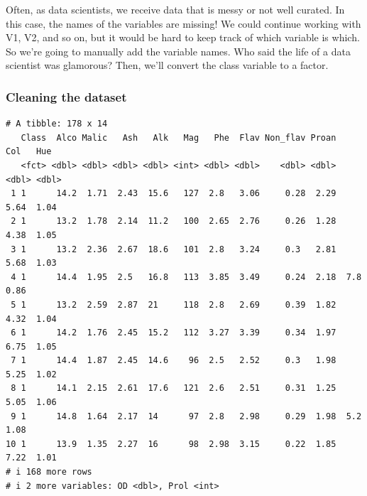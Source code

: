 \documentclass[
]{article}
\newenvironment{Shaded}{\begin{snugshade}}{\end{snugshade}}
\newcommand{\FunctionTok}[1]{\textcolor[rgb]{0.13,0.29,0.53}{\textbf{#1}}}
\newcommand{\NormalTok}[1]{#1}
\newcommand{\OtherTok}[1]{\textcolor[rgb]{0.56,0.35,0.01}{#1}}
\newcommand{\SpecialCharTok}[1]{\textcolor[rgb]{0.81,0.36,0.00}{\textbf{#1}}}
\newcommand{\StringTok}[1]{\textcolor[rgb]{0.31,0.60,0.02}{#1}}
\begin{document}
Often, as data scientists, we receive data that is messy or not well
curated. In this case, the names of the variables are missing! We could
continue working with V1, V2, and so on, but it would be hard to keep
track of which variable is which. So we're going to manually add the
variable names. Who said the life of a data scientist was glamorous?
Then, we'll convert the class variable to a factor.

\subsubsection{Cleaning the dataset}\label{cleaning-the-dataset}

\begin{Shaded}
\end{Shaded}

\begin{verbatim}
# A tibble: 178 x 14
   Class  Alco Malic   Ash   Alk   Mag   Phe  Flav Non_flav Proan   Col   Hue
   <fct> <dbl> <dbl> <dbl> <dbl> <int> <dbl> <dbl>    <dbl> <dbl> <dbl> <dbl>
 1 1      14.2  1.71  2.43  15.6   127  2.8   3.06     0.28  2.29  5.64  1.04
 2 1      13.2  1.78  2.14  11.2   100  2.65  2.76     0.26  1.28  4.38  1.05
 3 1      13.2  2.36  2.67  18.6   101  2.8   3.24     0.3   2.81  5.68  1.03
 4 1      14.4  1.95  2.5   16.8   113  3.85  3.49     0.24  2.18  7.8   0.86
 5 1      13.2  2.59  2.87  21     118  2.8   2.69     0.39  1.82  4.32  1.04
 6 1      14.2  1.76  2.45  15.2   112  3.27  3.39     0.34  1.97  6.75  1.05
 7 1      14.4  1.87  2.45  14.6    96  2.5   2.52     0.3   1.98  5.25  1.02
 8 1      14.1  2.15  2.61  17.6   121  2.6   2.51     0.31  1.25  5.05  1.06
 9 1      14.8  1.64  2.17  14      97  2.8   2.98     0.29  1.98  5.2   1.08
10 1      13.9  1.35  2.27  16      98  2.98  3.15     0.22  1.85  7.22  1.01
# i 168 more rows
# i 2 more variables: OD <dbl>, Prol <int>
\end{verbatim}
\end{document}
